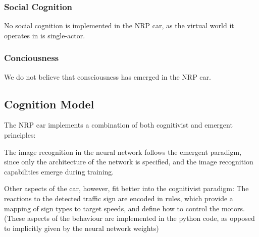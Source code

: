 \subsubsection{Social Cognition}
No social cognition is implemented in the NRP car, as the virtual world it operates in is single-actor.

\subsubsection{Conciousness}
We do not believe that consciousness has emerged in the NRP car. 

\subsection{Cognition Model}
The NRP car implements a combination of both cognitivist and emergent principles:

The image recognition in the neural network follows the emergent paradigm, since only the architecture of the network is specified, and the image recognition capabilities emerge during training.

Other aspects of the car, however, fit better into the cognitivist paradigm: The reactions to the detected traffic sign are encoded in rules, which provide a mapping of sign types to target speeds, and define how to control the motors. (These aspects of the behaviour are implemented in the python code, as opposed to implicitly given by the neural network weights)








